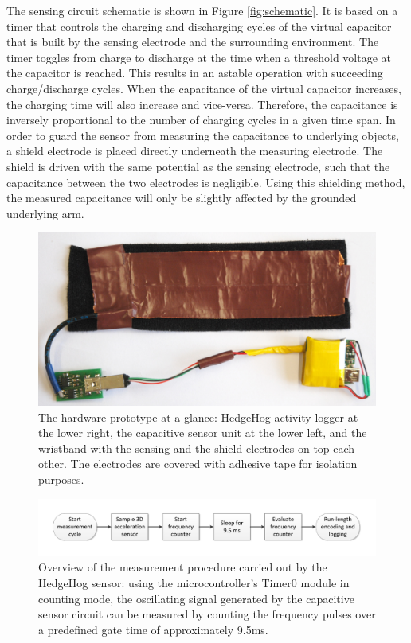 \documentclass[runningheads,a4paper]{llncs}
\begin{document}
The sensing circuit schematic is shown in Figure \ref{fig:schematic}. It is based on a timer that controls the charging and discharging cycles of the virtual capacitor that is built by the sensing electrode and the surrounding environment. The timer toggles from charge to discharge at the time when a threshold voltage at the capacitor is reached. This results in an astable operation with succeeding charge/discharge cycles. When the capacitance of the virtual capacitor increases, the charging time will also increase and vice-versa.
Therefore, the capacitance is inversely proportional to the number of charging cycles in a given time span. In order to guard the sensor from measuring the capacitance to underlying objects, a shield electrode is placed directly underneath the measuring electrode. The shield is driven with the same potential as the sensing electrode, such that the capacitance between the two electrodes is negligible. Using this shielding method, the measured capacitance will only be slightly affected by the grounded underlying arm.

\begin{figure}[t]
	\centering
		\includegraphics[width=\textwidth]{Images/capacitive_sensor_wristband_2.jpg}
	\caption{The hardware prototype at a glance: HedgeHog activity logger at the lower right, the capacitive sensor unit at the lower left, and the wristband with the sensing and the shield electrodes on-top each other. The electrodes are covered with adhesive tape for isolation purposes.}
	\label{fig:cap_sensor}
\end{figure}

\begin{figure}[t]
	\centering
 		\includegraphics[trim=1cm 1cm 1cm 1cm,clip,width=\textwidth]{Images/pseudocode.pdf}
	\caption{Overview of the measurement procedure carried out by the HedgeHog sensor: using the microcontroller's Timer0 module in counting mode, the oscillating signal generated by the capacitive sensor circuit can be measured by counting the frequency pulses over a predefined gate time of approximately 9.5ms.}
	\label{fig:pseudocode}
\end{figure}
\end{document}
